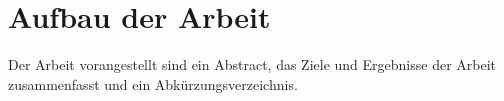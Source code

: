 
	





			

\section{Aufbau der Arbeit}
%	
	Der Arbeit vorangestellt sind ein Abstract, das Ziele und Ergebnisse der Arbeit zusammenfasst und ein Abkürzungsverzeichnis.\\
    

